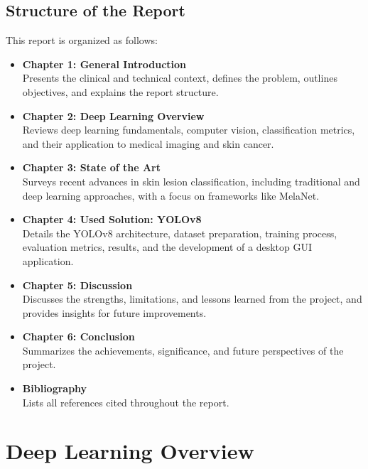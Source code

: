 \documentclass[a4paper,12pt]{report}
\begin{document}
\begin{spacing}{1.5}
    \newpage
    \section{Structure of the Report}
    This report is organized as follows:

    \begin{itemize}
        \item \textbf{Chapter 1: General Introduction} \\
        Presents the clinical and technical context, defines the problem, outlines objectives, and explains the report structure.

        \item \textbf{Chapter 2: Deep Learning Overview} \\
        Reviews deep learning fundamentals, computer vision, classification metrics, and their application to medical imaging and skin cancer.

        \item \textbf{Chapter 3: State of the Art} \\
        Surveys recent advances in skin lesion classification, including traditional and deep learning approaches, with a focus on frameworks like MelaNet.

        \item \textbf{Chapter 4: Used Solution: YOLOv8} \\
        Details the YOLOv8 architecture, dataset preparation, training process, evaluation metrics, results, and the development of a desktop GUI application.

        \item \textbf{Chapter 5: Discussion} \\
        Discusses the strengths, limitations, and lessons learned from the project, and provides insights for future improvements.

        \item \textbf{Chapter 6: Conclusion} \\
        Summarizes the achievements, significance, and future perspectives of the project.

        \item \textbf{Bibliography} \\
        Lists all references cited throughout the report.
    \end{itemize}


\chapter{Deep Learning Overview}


\end{spacing}
\end{document}
